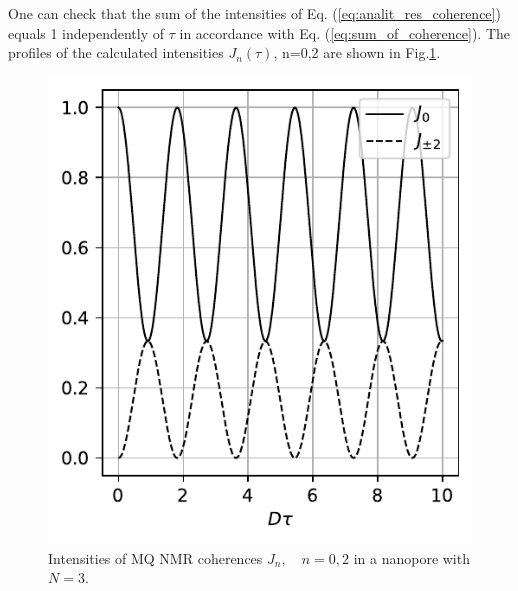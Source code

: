 One can check that the sum of the intensities of Eq.   (\ref{eq:analit_res_coherence}) equals 1 independently of $\tau$ in accordance with Eq.   (\ref{eq:sum_of_coherence}). The profiles of the calculated intensities $J_n(\tau)$, n=0,2 are shown in Fig.\ref{fig:exact_j}.
\begin{figure}
    \centering
    \includegraphics{src/exact_j.pdf}
    \caption{Intensities of MQ NMR coherences $J_n, \quad n=0, 2$ in a nanopore with $N = 3$.}
    \label{fig:exact_j}
\end{figure}
